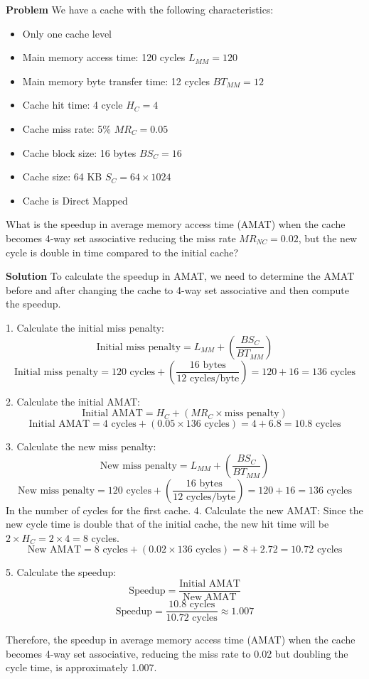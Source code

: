 \textbf{Problem}
We have a cache with the following characteristics:
\begin{itemize}
    \item Only one cache level
    \item Main memory access time: 120 cycles $L_{MM}=120$
    \item Main memory byte transfer time: 12 cycles $BT_{MM}=12$
    \item Cache hit time: 4 cycle $H_{C}=4$
    \item Cache miss rate: 5\% $MR_{C}=0.05$
    \item Cache block size: 16 bytes $BS_{C}=16$
    \item Cache size: 64 KB $S_{C}=64 \times 1024$
    \item Cache is Direct Mapped
\end{itemize}

What is the speedup in average memory access time (AMAT)  when the cache becomes 4-way set associative reducing the miss rate $MR_{NC}=0.02$, but the new cycle is double in time compared to the initial cache?

\textbf{Solution}
To calculate the speedup in AMAT, we need to determine the AMAT before and after changing the cache to 4-way set associative and then compute the speedup.

1. Calculate the initial miss penalty:
\[
\text{Initial miss penalty} = L_{MM} + \left(\frac{BS_{C}}{BT_{MM}}\right)
\]
\[
\text{Initial miss penalty} = 120 \text{ cycles} + \left(\frac{16 \text{ bytes}}{12 \text{ cycles/byte}}\right) = 120 + 16 = 136 \text{ cycles}
\]

2. Calculate the initial AMAT:
\[
\text{Initial AMAT} = H_{C} + (MR_{C} \times \text{miss penalty})
\]
\[
\text{Initial AMAT} = 4 \text{ cycles} + (0.05 \times 136 \text{ cycles}) = 4 + 6.8 = 10.8 \text{ cycles}
\]

3. Calculate the new miss penalty:
\[
\text{New miss penalty} = L_{MM} + \left(\frac{BS_{C}}{BT_{MM}}\right)
\]
\[
\text{New miss penalty} = 120 \text{ cycles} + \left(\frac{16 \text{ bytes}}{12 \text{ cycles/byte}}\right) = 120 + 16 = 136 \text{ cycles}
\]
In the number of cycles for the first cache.
4. Calculate the new AMAT:
Since the new cycle time is double that of the initial cache, the new hit time will be $2 \times H_{C} = 2 \times 4 = 8$ cycles.
\[
\text{New AMAT} = 8 \text{ cycles} + (0.02 \times 136 \text{ cycles}) = 8 + 2.72 = 10.72 \text{ cycles}
\]

5. Calculate the speedup:
\[
\text{Speedup} = \frac{\text{Initial AMAT}}{\text{New AMAT}}
\]
\[
\text{Speedup} = \frac{10.8 \text{ cycles}}{10.72 \text{ cycles}} \approx 1.007
\]

Therefore, the speedup in average memory access time (AMAT) when the cache becomes 4-way set associative, reducing the miss rate to 0.02 but doubling the cycle time, is approximately 1.007.
